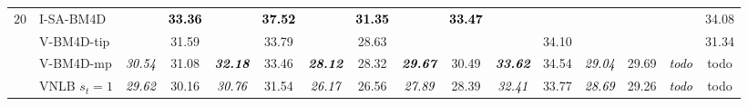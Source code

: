 \documentclass[10pt, journal, twocolumn, final, a4paper]{IEEEtran}
\newcommand{\bsic}[1]{\textcolor{black}{\textit{#1}}}
\newcommand{\Bsic}[1]{\textcolor{black}{\textbf{\textit{#1}}}}
\newcommand{\Best}[1]{\textbf{\textcolor{black}{#1}}}
\begin{document}
\begin{table}[htp!]
\begin{center}
{\begin{tabular}{ c | l |c c | c c | c c | c c | c c | c c | c c}
%                                                                                                                                                                                                                                                                         
			\multirow{1}{*}{$20$}                                                                                                                                                                                                                                            
			                      & I-SA-BM4D            & \bsic{     } & \Best{33.36} & \bsic{     } & \Best{37.52}  & \bsic{     } & \Best{31.35}  & \bsic{     } & \Best{33.47} &              &               &              &              & \bsic{     } &       34.08  \\
			                      & V-BM4D-tip           & \bsic{     } &       31.59  & \bsic{     } &       33.79   & \bsic{     } &       28.63   &              &              &              &       34.10   &              &              & \bsic{     } &       31.34  \\
			                      & V-BM4D-mp            & \bsic{30.54} &       31.08  & \Bsic{32.18} &       33.46   & \Bsic{28.12} &       28.32   & \Bsic{29.67} &       30.49  & \Bsic{33.62} &       34.54   & \bsic{29.04} &       29.69  & \bsic{todo } &       todo   \\
			                      & VNLB   $s_t = 1$     & \bsic{29.62} &       30.16  & \bsic{30.76} &       31.54   & \bsic{26.17} &       26.56   & \bsic{27.89} &       28.39  & \bsic{32.41} &       33.77   & \bsic{28.69} &       29.26  & \bsic{todo } &       todo   \\

\end{tabular}}
\end{center}
\end{table}
\end{document}
